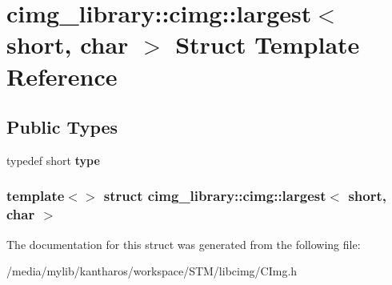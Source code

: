 \hypertarget{structcimg__library_1_1cimg_1_1largest_3_01short_00_01char_01_4}{
\section{cimg\_\-library::cimg::largest$<$ short, char $>$ Struct Template Reference}
\label{structcimg__library_1_1cimg_1_1largest_3_01short_00_01char_01_4}
}
\subsection*{Public Types}
\begin{DoxyCompactItemize}
\item 
\hypertarget{structcimg__library_1_1cimg_1_1largest_3_01short_00_01char_01_4_aecb67d51f89389b08305c7c208ab050a}{
typedef short {\bfseries type}}
\label{structcimg__library_1_1cimg_1_1largest_3_01short_00_01char_01_4_aecb67d51f89389b08305c7c208ab050a}

\end{DoxyCompactItemize}
\subsubsection*{template$<$$>$ struct cimg\_\-library::cimg::largest$<$ short, char $>$}



The documentation for this struct was generated from the following file:\begin{DoxyCompactItemize}
\item 
/media/mylib/kantharos/workspace/STM/libcimg/CImg.h\end{DoxyCompactItemize}
